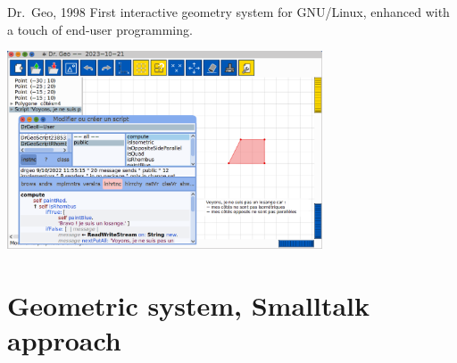 \documentclass{beamer}
\newcommand{\drgeo}{Dr.~Geo}
\begin{document}
\begin{frame}{\drgeo, 1998\cite{drgeo,fernandes98}}
  First interactive geometry system for GNU/Linux,
  enhanced with a touch of end-user programming.
    \begin{center}
    \includegraphics[width=0.7\textwidth]{drgeoScript.png}           
  \end{center}
\end{frame}

\section{Geometric system, Smalltalk approach}
\end{document}
